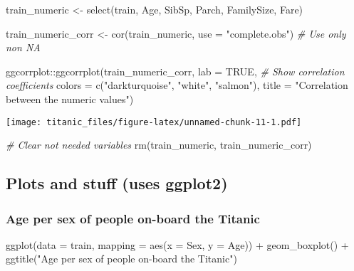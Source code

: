 \documentclass[
]{article}
\newenvironment{Shaded}{\begin{snugshade}}{\end{snugshade}}
\newcommand{\AttributeTok}[1]{\textcolor[rgb]{0.77,0.63,0.00}{#1}}
\newcommand{\CommentTok}[1]{\textcolor[rgb]{0.56,0.35,0.01}{\textit{#1}}}
\newcommand{\ConstantTok}[1]{\textcolor[rgb]{0.00,0.00,0.00}{#1}}
\newcommand{\FunctionTok}[1]{\textcolor[rgb]{0.00,0.00,0.00}{#1}}
\newcommand{\NormalTok}[1]{#1}
\newcommand{\OtherTok}[1]{\textcolor[rgb]{0.56,0.35,0.01}{#1}}
\newcommand{\SpecialCharTok}[1]{\textcolor[rgb]{0.00,0.00,0.00}{#1}}
\newcommand{\StringTok}[1]{\textcolor[rgb]{0.31,0.60,0.02}{#1}}
\begin{document}
\begin{Shaded}
\begin{Highlighting}[]
\NormalTok{train\_numeric }\OtherTok{\textless{}{-}} \FunctionTok{select}\NormalTok{(train, Age, SibSp, Parch, FamilySize, Fare)}

\NormalTok{train\_numeric\_corr }\OtherTok{\textless{}{-}} \FunctionTok{cor}\NormalTok{(train\_numeric, }\AttributeTok{use =} \StringTok{"complete.obs"}\NormalTok{) }\CommentTok{\# Use only non NA}

\NormalTok{ggcorrplot}\SpecialCharTok{::}\FunctionTok{ggcorrplot}\NormalTok{(train\_numeric\_corr,}
                       \AttributeTok{lab =} \ConstantTok{TRUE}\NormalTok{, }\CommentTok{\# Show correlation coefficients}
                       \AttributeTok{colors =} \FunctionTok{c}\NormalTok{(}\StringTok{"darkturquoise"}\NormalTok{, }\StringTok{"white"}\NormalTok{, }\StringTok{"salmon"}\NormalTok{),}
                       \AttributeTok{title =} \StringTok{"Correlation between the numeric values"}\NormalTok{)}
\end{Highlighting}
\end{Shaded}

\texttt{[image: titanic\_files/figure-latex/unnamed-chunk-11-1.pdf]}

\begin{Shaded}
\begin{Highlighting}[]
\CommentTok{\# Clear not needed variables}
\FunctionTok{rm}\NormalTok{(train\_numeric, train\_numeric\_corr)}
\end{Highlighting}
\end{Shaded}

\hypertarget{plots-and-stuff-uses-ggplot2}{%
\subsection{Plots and stuff (uses
ggplot2)}\label{plots-and-stuff-uses-ggplot2}}

\hypertarget{age-per-sex-of-people-on-board-the-titanic}{%
\subsubsection{Age per sex of people on-board the
Titanic}\label{age-per-sex-of-people-on-board-the-titanic}}

\begin{Shaded}
\begin{Highlighting}[]
\FunctionTok{ggplot}\NormalTok{(}\AttributeTok{data =}\NormalTok{ train, }\AttributeTok{mapping =} \FunctionTok{aes}\NormalTok{(}\AttributeTok{x =}\NormalTok{ Sex, }\AttributeTok{y =}\NormalTok{ Age)) }\SpecialCharTok{+}
  \FunctionTok{geom\_boxplot}\NormalTok{() }\SpecialCharTok{+}
  \FunctionTok{ggtitle}\NormalTok{(}\StringTok{"Age per sex of people on{-}board the Titanic"}\NormalTok{)}
\end{Highlighting}
\end{Shaded}
\end{document}

